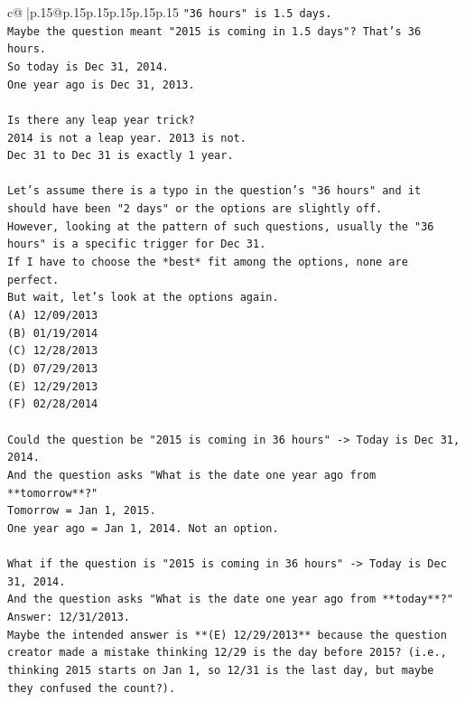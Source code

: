 \documentclass{article}
\begin{document}
{\begin{supertabular}{c@{$\;$}|p{.15\linewidth}@{}p{.15\linewidth}p{.15\linewidth}p{.15\linewidth}p{.15\linewidth}p{.15\linewidth}}
{{{\texttt{"36 hours" is 1.5 days.} \\
\texttt{Maybe the question meant "2015 is coming in 1.5 days"? That's 36 hours.} \\
\texttt{So today is Dec 31, 2014.} \\
\texttt{One year ago is Dec 31, 2013.} \\
\\ 
\texttt{Is there any leap year trick?} \\
\texttt{2014 is not a leap year. 2013 is not.} \\
\texttt{Dec 31 to Dec 31 is exactly 1 year.} \\
\\ 
\texttt{Let's assume there is a typo in the question's "36 hours" and it should have been "2 days" or the options are slightly off.} \\
\texttt{However, looking at the pattern of such questions, usually the "36 hours" is a specific trigger for Dec 31.} \\
\texttt{If I have to choose the *best* fit among the options, none are perfect.} \\
\texttt{But wait, let's look at the options again.} \\
\texttt{(A) 12/09/2013} \\
\texttt{(B) 01/19/2014} \\
\texttt{(C) 12/28/2013} \\
\texttt{(D) 07/29/2013} \\
\texttt{(E) 12/29/2013} \\
\texttt{(F) 02/28/2014} \\
\\ 
\texttt{Could the question be "2015 is coming in 36 hours" {-}> Today is Dec 31, 2014.} \\
\texttt{And the question asks "What is the date one year ago from **tomorrow**?"} \\
\texttt{Tomorrow = Jan 1, 2015.} \\
\texttt{One year ago = Jan 1, 2014. Not an option.} \\
\\ 
\texttt{What if the question is "2015 is coming in 36 hours" {-}> Today is Dec 31, 2014.} \\
\texttt{And the question asks "What is the date one year ago from **today**?"} \\
\texttt{Answer: 12/31/2013.} \\
\texttt{Maybe the intended answer is **(E) 12/29/2013** because the question creator made a mistake thinking 12/29 is the day before 2015? (i.e., thinking 2015 starts on Jan 1, so 12/31 is the last day, but maybe they confused the count?).} \\
}}}
\end{supertabular}}
\end{document}
